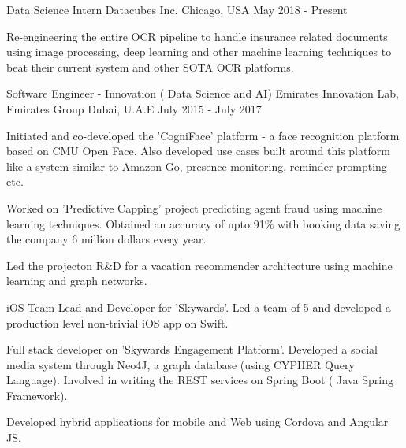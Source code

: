 

\begin{cventries}

  \cventry
    {Data Science Intern} %
    {Datacubes Inc.} %
    {Chicago, USA} %
    {May 2018 - Present} %
    {
      \begin{cvitems} %
        \item {Re-engineering the entire OCR pipeline to handle insurance related documents using image processing, deep learning and other machine learning techniques to beat their current system and other SOTA OCR platforms.}
      \end{cvitems}
    }

  \cventry
    {Software Engineer - Innovation ( Data Science and AI)} %
    {Emirates Innovation Lab, Emirates Group} %
    {Dubai, U.A.E} %
    {July 2015 - July 2017} %
    {
      \begin{cvitems} %
        \item {Initiated and co-developed the 'CogniFace' platform - a face recognition platform based on CMU Open Face. Also developed use cases built around this platform like a system similar to Amazon Go, presence monitoring, reminder prompting etc. }
        \item {Worked on 'Predictive Capping' project predicting agent fraud using machine learning techniques. Obtained an accuracy of upto 91\% with booking data saving the company 6 million dollars every year.}
        \item {Led the projecton R\&D for a vacation recommender architecture using machine learning and graph networks.}
        \item {iOS Team Lead and Developer for 'Skywards'. Led a team of 5 and developed a production level non-trivial iOS app on Swift.}
        \item {Full stack developer on 'Skywards Engagement Platform'. Developed a social media system through Neo4J, a graph
database (using CYPHER Query Language). Involved in writing the REST services on Spring Boot ( Java Spring Framework).}
        \item {Developed hybrid applications for mobile and Web using Cordova and Angular JS.}
      \end{cvitems}
    }
\end{cventries}
